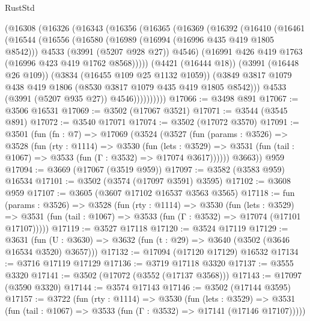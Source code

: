 \begin{lexlean}{RustStd}
\begin{coremodule}
          (@16308
            (@16326
              (@16343
                (@16356
                  (@16365
                    (@16369
                      (@16392
                        (@16410
                          (@16461
                            (@16544
                              (@16556
                                (@16580
                                  (@16989 (@16994 (@16996 @435 @419 @1805 @8542)))
                                  @4533
                                  (@3991 (@5207 @928 @27))
                                  @4546)
                                (@16991 @426 @419 @1763 (@16996 @423 @419 @1762 @8568)))))
                          (@4421 (@16444 @18))
                          (@3991 (@16448 @26 @109))
                          (@3834 (@16455 @109 @25 @1132 @1059))
                          (@3849
                            @3817
                            @1079
                            @438
                            @419
                            @1806
                            (@8530 @3817 @1079 @435 @419 @1805 @8542)))
                        @4533
                        (@3991 (@5207 @935 @27))
                        @4546))))))))))
@17066 := @3498 @891
@17067 := @3506 @16531
@17069 := @3502 (@17067 @3521)
@17071 := @3544 (@3545 @891)
@17072 := @3540 @17071
@17074 := @3502 (@17072 @3570)
@17091 := @3501
    (fun (fn : @7) =>
    @17069
      (@3524
        (@3527
          (fun (params : @3526) =>
          @3528
            (fun (rty : @1114) =>
            @3530
              (fun (lets : @3529) =>
              @3531 (fun (tail : @1067) => @3533 (fun (Γ : @3532) => @17074 @3617))))))
        @3663))
    @959
@17094 := @3669 (@17067 (@3519 @959))
@17097 := @3582 (@3583 @959) @16534
@17101 := @3502 (@3574 (@17097 @3591) @3595)
@17102 := @3608 @959
@17107 := @3605 (@3607 @17102 @16537 @3563 @3565)
@17118 := fun (params : @3526) =>
  @3528
    (fun (rty : @1114) =>
    @3530
      (fun (lets : @3529) =>
      @3531 (fun (tail : @1067) => @3533 (fun (Γ : @3532) => @17074 (@17101 @17107)))))
@17119 := @3527 @17118
@17120 := @3524 @17119
@17129 := @3631
    (fun (U : @3630) => @3632 (fun (t : @29) => @3640 (@3502 (@3646 @16534 @3520) @3657)))
@17132 := @17094 (@17120 @17129) @16532
@17134 := @3716 @17119 @17129
@17136 := @3719 @17118 @3320
@17137 := @3555 @3320
@17141 := @3502 (@17072 (@3552 (@17137 @3568)))
@17143 := @17097 (@3590 @3320)
@17144 := @3574 @17143
@17146 := @3502 (@17144 @3595)
@17157 := @3722
    (fun (rty : @1114) =>
    @3530
      (fun (lets : @3529) =>
      @3531 (fun (tail : @1067) => @3533 (fun (Γ : @3532) => @17141 (@17146 @17107)))))

\end{coremodule}
\end{lexlean}
